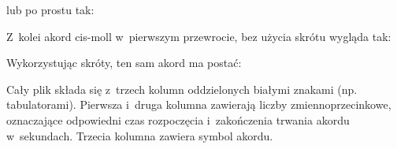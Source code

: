 \begin{center}
\end{center}
lub po prostu tak:
\begin{center}
\end{center}
Z~kolei akord cis-moll w~pierwszym przewrocie, bez użycia skrótu wygląda tak:
\begin{center}
\end{center}
Wykorzystując skróty, ten sam akord ma postać:
\begin{center}
\end{center}
Cały plik  składa się z~trzech kolumn oddzielonych białymi znakami (np. tabulatorami).  Pierwsza i~druga kolumna zawierają liczby zmiennoprzecinkowe, oznaczające odpowiedni czas rozpoczęcia i~zakończenia trwania akordu w~sekundach. Trzecia kolumna zawiera symbol akordu.

